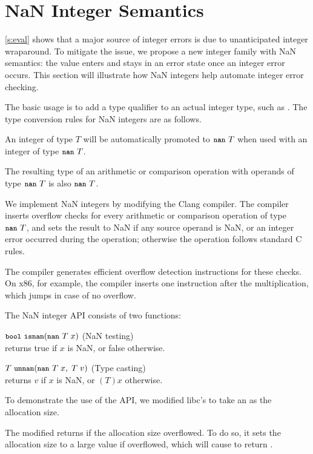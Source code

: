 \section{NaN Integer Semantics}
\label{s:miti}

\autoref{s:eval} shows that a major source of integer errors is due
to unanticipated integer wraparound.  To mitigate the issue, we
propose a new integer family with NaN semantics: the value enters
and stays in an error state once an integer error occurs.
%
This section will illustrate how NaN integers help automate integer
error checking.

The basic usage is to add a type qualifier 
to an actual integer type, such as . The type conversion
rules for NaN integers are as follows.
\begin{CompactItemize}
\item
An integer of type $T$ will be automatically promoted to $\cc{nan}\ T$
when used with an integer of type $\cc{nan}\ T$.
\item
The resulting type of an arithmetic or comparison operation with
operands of type $\cc{nan}\ T$ is also $\cc{nan}\ T$.
\end{CompactItemize}

We implement NaN integers by modifying the Clang compiler.
The compiler inserts overflow checks for every arithmetic or
comparison operation of type $\cc{nan}\ T$, and sets the result to
NaN if any source operand is NaN, or an integer error occurred
during the operation; otherwise the operation follows standard C rules.

The compiler generates efficient overflow detection instructions
for these checks. On x86, for example,
the compiler inserts one  instruction after the 
multiplication, which jumps in case of no overflow.

The NaN integer API consists of two functions:
\begin{CompactItemize}
\item
$\cc{bool}\ \cc{isnan}(\cc{nan}\ T\; x)$ \hfill (NaN testing) \\
returns true if $x$ is NaN, or false otherwise.
\item
$T\ \cc{unnan}(\cc{nan}\ T\; x,\; T\; v)$ \hfill (Type casting) \\
returns $v$ if $x$ is NaN, or $(T)x$ otherwise.
\end{CompactItemize}

To demonstrate the use of the API, we modified libc's 
to take an  as the allocation size.

The modified  returns  if the allocation size
overflowed.  To do so, it sets the allocation size to a large value
 if  overflowed, which will cause
 to return .

